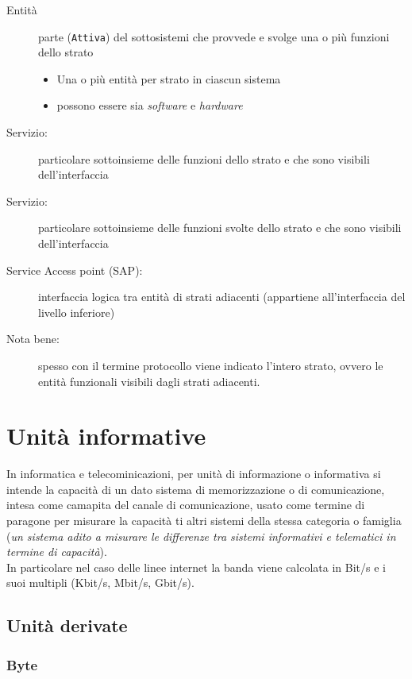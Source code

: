 \begin{description}
\item[Entità] parte ({\tt Attiva}) del sottosistemi che provvede e svolge una o più funzioni dello strato
  \begin{itemize}
  \item Una o più entità per strato in ciascun sistema
  \item possono essere sia \textit{software} e \textit{hardware}
  \end{itemize}
\item[Servizio:] particolare sottoinsieme delle funzioni dello strato e che sono visibili dell'interfaccia
\item[Servizio:] particolare sottoinsieme delle funzioni svolte dello strato e che sono visibili dell'interfaccia
\item[Service Access point (SAP):] interfaccia logica tra entità di strati adiacenti (appartiene all'interfaccia
  del livello inferiore)
\item[Nota bene:] spesso con il termine protocollo viene indicato l'intero strato, ovvero le entità funzionali
  visibili dagli strati adiacenti.
\end{description}

\section{Unità informative}
\label{sec:uninfo}

\begin{defi}
  In informatica e telecominicazioni, per unità di informazione o informativa si intende la capacità di un dato
  sistema di memorizzazione o di comunicazione, intesa come camapita del canale di comunicazione, usato come
  termine di paragone per misurare la capacità ti altri sistemi della stessa categoria o famiglia ({\it un sistema
    adito a misurare le differenze tra sistemi informativi e telematici in termine di capacità}).\\
  In particolare nel caso delle linee internet la banda viene calcolata in Bit/s e i suoi multipli
  (Kbit/s, Mbit/s, Gbit/s). 
\end{defi}

\subsection{Unità derivate}
\label{sec:uninfoder}

\subsubsection{Byte}
\label{sec:byte}

